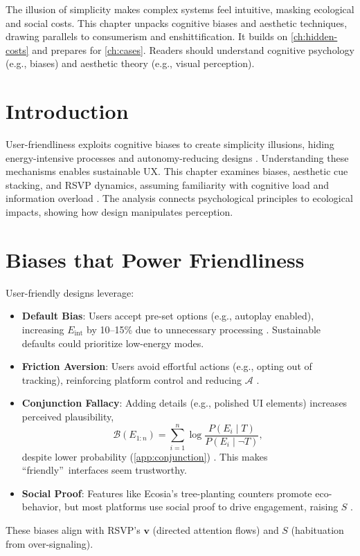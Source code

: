 \documentclass[openany]{book}
\newcommand{\vvec}{\mathbf{v}} %
\newcommand{\Sent}{S} %
\newcommand{\Eint}{E_{\mathrm{int}}} %
\newcommand{\Auton}{\mathcal{A}} %
\begin{document}
The illusion of simplicity makes complex systems feel intuitive, masking ecological and social costs. This chapter unpacks cognitive biases and aesthetic techniques, drawing parallels to consumerism and enshittification. It builds on \cref{ch:hidden-costs} and prepares for \cref{ch:cases}. Readers should understand cognitive psychology (e.g., biases) and aesthetic theory (e.g., visual perception).

\section{Introduction}
\label{sec:illusion-intro}
User-friendliness exploits cognitive biases to create simplicity illusions, hiding energy-intensive processes and autonomy-reducing designs \citep{colak2024,doctorow2022}. Understanding these mechanisms enables sustainable UX. This chapter examines biases, aesthetic cue stacking, and RSVP dynamics, assuming familiarity with cognitive load and information overload \citep{norman1988}. The analysis connects psychological principles to ecological impacts, showing how design manipulates perception.

\section{Biases that Power Friendliness}
\label{sec:biases}
User-friendly designs leverage:
\begin{itemize}
  \item \textbf{Default Bias}: Users accept pre-set options (e.g., autoplay enabled), increasing \(\Eint\) by 10--15\% due to unnecessary processing \citep{colak2024}. Sustainable defaults could prioritize low-energy modes.
  \item \textbf{Friction Aversion}: Users avoid effortful actions (e.g., opting out of tracking), reinforcing platform control and reducing \(\Auton\) \citep{doctorow2022}.
  \item \textbf{Conjunction Fallacy}: Adding details (e.g., polished UI elements) increases perceived plausibility,
  \begin{equation}
  \label{eq:believability}
  \mathcal{B}(E_{1:n}) = \sum_{i=1}^n \log \frac{P(E_i \mid T)}{P(E_i \mid \neg T)},
  \end{equation}
  despite lower probability (\cref{app:conjunction}) \citep{tversky1983}. This makes \textquotedblleft friendly\textquotedblright\ interfaces seem trustworthy.
  \item \textbf{Social Proof}: Features like Ecosia’s tree-planting counters promote eco-behavior, but most platforms use social proof to drive engagement, raising \(\Sent\) \citep{colak2024}.
\end{itemize}
These biases align with RSVP’s \(\vvec\) (directed attention flows) and \(\Sent\) (habituation from over-signaling).
\end{document}
